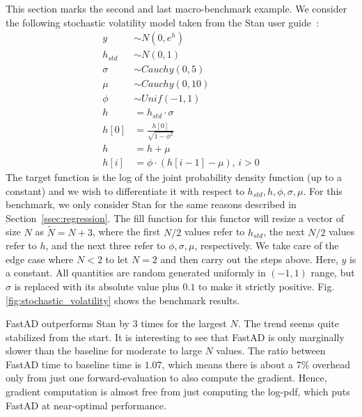 This section marks the second and last macro-benchmark example.
We consider the following stochastic volatility model 
taken from the Stan user guide~\cite{stan-rm:2018}:
\begin{align*}
    y &\sim N(0, e^{h}) \\
    h_{std} &\sim N(0, 1) \\
    \sigma &\sim Cauchy(0,5) \\
    \mu &\sim Cauchy(0,10) \\
    \phi &\sim Unif(-1, 1) \\
    h &= h_{std} \cdot \sigma \\
    h[0] &= \frac{h[0]}{\sqrt{1 - \phi^2}} \\
    h &= h + \mu \\
    h[i] &= \phi \cdot (h[i-1] - \mu),\, i > 0
\end{align*}
The target function is the log of the joint probability density function (up to a constant)
and we wish to differentiate it with respect to $h_{std}, h, \phi, \sigma, \mu$.
For this benchmark, we only consider Stan for the same reasons described in Section~\ref{ssec:regression}.
The fill function for this functor will resize a vector of size $N$ as $\tilde{N} = N + 3$,
where the first $N/2$ values refer to $h_{std}$,
the next $N/2$ values refer to $h$,
and the next three refer to $\phi, \sigma, \mu$, respectively.
We take care of the edge case where $N < 2$ to let $N = 2$ and then carry out the steps above.
Here, $y$ is a constant.
All quantities are random generated uniformly in $(-1,1)$ range,
but $\sigma$ is replaced with its absolute value plus $0.1$ to make it strictly positive.
Fig.\ref{fig:stochastic_volatility} shows the benchmark results.

FastAD outperforms Stan by 3 times for the largest $N$.
The trend seems quite stabilized from the start.
It is interesting to see that FastAD is only marginally slower than the  baseline
for moderate to large $N$ values.
The ratio between FastAD time to baseline time is $ 1.07$, which means there is about a $7\%$ overhead only
from just one forward-evaluation to also compute the gradient.
Hence, gradient computation is almost free from just computing the log-pdf,
which puts FastAD at near-optimal performance.
